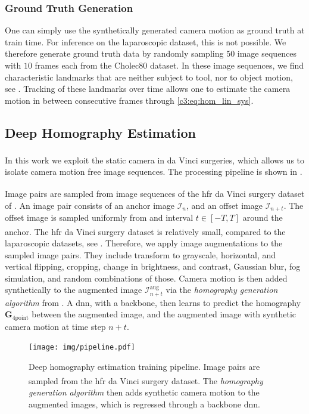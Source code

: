 \subsubsection{Ground Truth Generation}
\label{c3:sec:gt_gen}
One can simply use the synthetically generated camera motion as ground truth at train time. For inference on the laparoscopic dataset, this is not possible. We therefore generate ground truth data by randomly sampling $50$ image sequences with $10$ frames each from the Cholec80 dataset. In these image sequences, we find characteristic landmarks that are neither subject to tool, nor to object motion, see . Tracking of these landmarks over time allows one to estimate the camera motion in between consecutive frames through \eqref{c3:eq:hom_lin_sys}.

\subsection{Deep Homography Estimation}

In this work we exploit the static camera in da Vinci\textsuperscript{\textregistered} surgeries, which allows us to isolate camera motion free image sequences. The processing pipeline is shown in .

Image pairs are sampled from image sequences of the \gls{hfr} da Vinci\textsuperscript{\textregistered} surgery dataset of . An image pair consists of an anchor image $\mathcal{I}_n$, and an offset image $\mathcal{I}_{n+t}$. The offset image is sampled uniformly from and interval $t\in[-T,T]$ around the anchor. The \gls{hfr} da Vinci\textsuperscript{\textregistered} surgery dataset is relatively small, compared to the laparoscopic datasets, see . Therefore, we apply image augmentations to the sampled image pairs. They include transform to grayscale, horizontal, and vertical flipping, cropping, change in brightness, and contrast, Gaussian blur, fog simulation, and random combinations of those. Camera motion is then added synthetically to the augmented image $\mathcal{I}^\text{aug}_{n+t}$ via the \textit{homography generation algorithm} from . A \gls{dnn}, with a backbone, then learns to predict the homography $\mathbf{G}_{4\text{point}}$ between the augmented image, and the augmented image with synthetic camera motion at time step $n+t$.

\begin{figure}[tb]
    \centering
    \texttt{[image: img/pipeline.pdf]}
    \caption{Deep homography estimation training pipeline. Image pairs are sampled from the \gls{hfr} da Vinci\textsuperscript{\textregistered} surgery dataset. The \textit{homography generation algorithm} then adds synthetic camera motion to the augmented images, which is regressed through a backbone \gls{dnn}.}
    \label{c3:fig:hom}
\end{figure}

